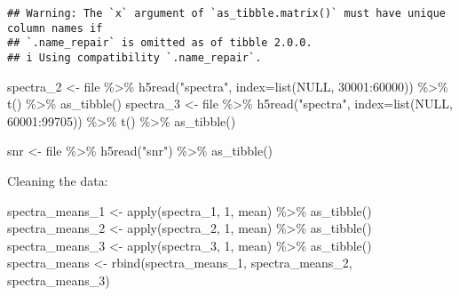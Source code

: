 \documentclass[
]{article}
\newenvironment{Shaded}{\begin{snugshade}}{\end{snugshade}}
\newcommand{\AttributeTok}[1]{\textcolor[rgb]{0.77,0.63,0.00}{#1}}
\newcommand{\ConstantTok}[1]{\textcolor[rgb]{0.00,0.00,0.00}{#1}}
\newcommand{\DecValTok}[1]{\textcolor[rgb]{0.00,0.00,0.81}{#1}}
\newcommand{\FunctionTok}[1]{\textcolor[rgb]{0.00,0.00,0.00}{#1}}
\newcommand{\NormalTok}[1]{#1}
\newcommand{\OtherTok}[1]{\textcolor[rgb]{0.56,0.35,0.01}{#1}}
\newcommand{\SpecialCharTok}[1]{\textcolor[rgb]{0.00,0.00,0.00}{#1}}
\newcommand{\StringTok}[1]{\textcolor[rgb]{0.31,0.60,0.02}{#1}}
\begin{document}
\begin{verbatim}
## Warning: The `x` argument of `as_tibble.matrix()` must have unique column names if
## `.name_repair` is omitted as of tibble 2.0.0.
## i Using compatibility `.name_repair`.
\end{verbatim}

\begin{Shaded}
\begin{Highlighting}[]
\NormalTok{spectra\_2 }\OtherTok{\textless{}{-}}\NormalTok{ file }\SpecialCharTok{\%\textgreater{}\%} \FunctionTok{h5read}\NormalTok{(}\StringTok{"spectra"}\NormalTok{, }\AttributeTok{index=}\FunctionTok{list}\NormalTok{(}\ConstantTok{NULL}\NormalTok{, }\DecValTok{30001}\SpecialCharTok{:}\DecValTok{60000}\NormalTok{)) }\SpecialCharTok{\%\textgreater{}\%} \FunctionTok{t}\NormalTok{() }\SpecialCharTok{\%\textgreater{}\%} \FunctionTok{as\_tibble}\NormalTok{()}
\NormalTok{spectra\_3 }\OtherTok{\textless{}{-}}\NormalTok{ file }\SpecialCharTok{\%\textgreater{}\%} \FunctionTok{h5read}\NormalTok{(}\StringTok{"spectra"}\NormalTok{, }\AttributeTok{index=}\FunctionTok{list}\NormalTok{(}\ConstantTok{NULL}\NormalTok{, }\DecValTok{60001}\SpecialCharTok{:}\DecValTok{99705}\NormalTok{)) }\SpecialCharTok{\%\textgreater{}\%} \FunctionTok{t}\NormalTok{() }\SpecialCharTok{\%\textgreater{}\%} \FunctionTok{as\_tibble}\NormalTok{()}

\NormalTok{snr }\OtherTok{\textless{}{-}}\NormalTok{ file }\SpecialCharTok{\%\textgreater{}\%} \FunctionTok{h5read}\NormalTok{(}\StringTok{"snr"}\NormalTok{) }\SpecialCharTok{\%\textgreater{}\%} \FunctionTok{as\_tibble}\NormalTok{()}
\end{Highlighting}
\end{Shaded}

Cleaning the data:

\begin{Shaded}
\begin{Highlighting}[]
\NormalTok{spectra\_means\_1 }\OtherTok{\textless{}{-}} \FunctionTok{apply}\NormalTok{(spectra\_1, }\DecValTok{1}\NormalTok{, mean) }\SpecialCharTok{\%\textgreater{}\%} \FunctionTok{as\_tibble}\NormalTok{()}
\NormalTok{spectra\_means\_2 }\OtherTok{\textless{}{-}} \FunctionTok{apply}\NormalTok{(spectra\_2, }\DecValTok{1}\NormalTok{, mean) }\SpecialCharTok{\%\textgreater{}\%} \FunctionTok{as\_tibble}\NormalTok{()}
\NormalTok{spectra\_means\_3 }\OtherTok{\textless{}{-}} \FunctionTok{apply}\NormalTok{(spectra\_3, }\DecValTok{1}\NormalTok{, mean) }\SpecialCharTok{\%\textgreater{}\%} \FunctionTok{as\_tibble}\NormalTok{()}
\NormalTok{spectra\_means }\OtherTok{\textless{}{-}} \FunctionTok{rbind}\NormalTok{(spectra\_means\_1, spectra\_means\_2, spectra\_means\_3)}
\end{Highlighting}
\end{Shaded}
\end{document}
